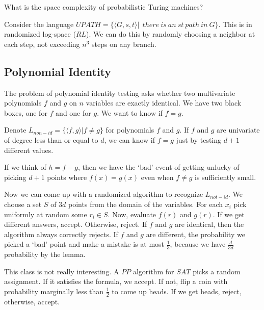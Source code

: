\documentclass[twoside]{article}
\begin{document}
What is the space complexity of probabilistic Turing machines?

Consider the language $UPATH = \{ \langle G,s,t \rangle | \ \ there \ is \ an \ st \ path \ in \ G     \}$.  This is in randomized log-space ($RL$).  We can do this by randomly choosing a neighbor at each step, not exceeding $n^3$ steps on any branch.




\subsection*{Polynomial Identity}
The problem of polynomial identity testing asks whether two multivariate polynomials $f$ and $g$ on $n$ variables are exactly identical.  We have two black boxes, one for $f$ and one for $g$.  We want to know if $f=g$.

Denote $L_{non-id}=\{ \langle f, g \rangle | f\neq g   \}$ for polynomials $f$ and $g$.  If $f$ and $g$ are univariate of degree less than or equal to $d$, we can know if $f=g$ just by testing $d+1$ different values.  




If we think of $h=f-g$, then we have the `bad' event of getting unlucky of picking $d+1$ points where $f(x)=g(x)$ even when $f\neq g$ is sufficiently small.

Now we can come up with a randomized algorithm to recognize $L_{not-id}$.  We choose a set $S$ of $3d$ points from the domain of the variables.  For each $x_i$ pick uniformly at random some $r_i\in S$.  Now, evaluate $f(r)$ and $g(r)$.  If we get different answers, accept.  Otherwise, reject.  If $f$ and $g$ are identical, then the algorithm always correctly rejects.  If $f$ and $g$ are different, the probability we picked a `bad' point and make a mistake is at most $\frac{1}{3}$, because we have $\frac{d}{3d}$ probability by the lemma.



This class is not really interesting.  A $PP$ algorithm for $SAT$ picks a random assignment.  If it satisfies the formula, we accept.  If not, flip a coin with probability marginally less than $\frac{1}{2}$ to come up heads.  If we get heads, reject, otherwise, accept.
\end{document}
